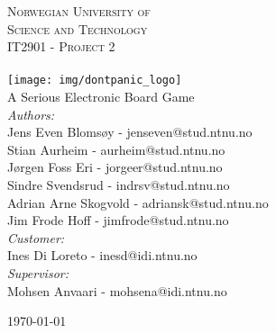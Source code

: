 \begin{center}



\textsc{\LARGE Norwegian University of\\ Science and Technology}\\[1.5cm]

\textsc{\Large IT2901 - Project 2}\\[0.5cm]

\HRule \\[0.4cm]
{%
	\texttt{[image: img/dontpanic\_logo]}\\[0.4cm]}
	A Serious Electronic Board Game
\HRule \\[1.5cm]


	\emph{Authors:}\\
	Jens Even Blomsøy 		- 	jenseven@stud.ntnu.no\\
	Stian Aurheim 			- 	aurheim@stud.ntnu.no\\
	Jørgen Foss Eri 		-	jorgeer@stud.ntnu.no\\
	Sindre Svendsrud 		-	indrsv@stud.ntnu.no\\
	Adrian Arne Skogvold 	- 	adriansk@stud.ntnu.no\\
	Jim Frode Hoff 			- 	jimfrode@stud.ntnu.no\\
	\vspace{10 mm}
	\emph{Customer:} \\
	Ines Di Loreto			- 	inesd@idi.ntnu.no\\
	\vspace{10 mm}
	\emph{Supervisor:} \\
	Mohsen Anvaari			-	mohsena@idi.ntnu.no\\

\vfill

{\large \today}

\end{center}
\pagebreak
